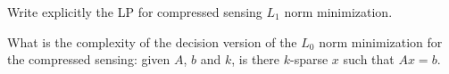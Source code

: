 \documentclass[12pt]{uebung}
\begin{document}
 

\newcommand{\bigo}{\mathcal{O}}
\renewcommand{\aufgname}{Exercise}

\begin{aufg}
Write explicitly the LP for compressed sensing $L_1$ norm minimization.
\end{aufg}

\begin{aufg}[2 pts.]
What is the complexity of the decision version of the $L_0$ norm minimization for the compressed sensing: given $A$, $b$ and $k$, is there $k$-sparse $x$ such that $Ax = b$.
\end{aufg}
\end{document}
